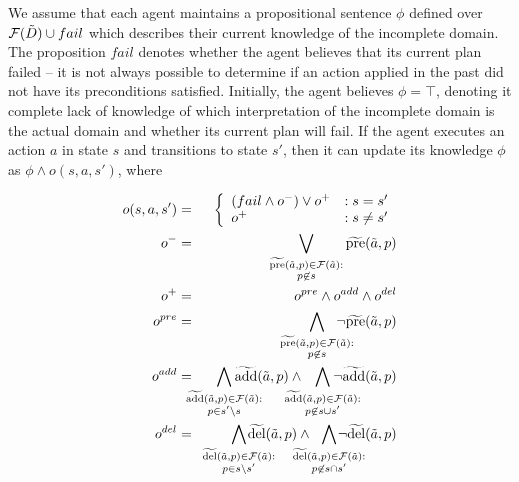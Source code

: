 \documentclass{article}
\begin{document}
We assume that each agent maintains a propositional sentence $\phi$ defined over ${\cal F}(\tilde{D}) \cup fail$ which describes their current knowledge of the incomplete domain.  The proposition $fail$ denotes whether the agent believes that its current plan failed -- it is not always possible to determine if an action applied in the past did not have its preconditions satisfied.  Initially, the agent believes $\phi = \top$, denoting it complete lack of knowledge of which interpretation of the incomplete domain is the actual domain and whether its current plan will fail.    If the agent executes an action $a$ in state $s$ and transitions to state $s'$, then it can update its knowledge $\phi$ as $\phi \wedge o(s, a, s')$, where 

\noindent \begin{eqnarray}
o(s, a, s') &=& \left\{ \begin{array}{ll}
(fail \wedge o^-) \vee  o^+  &: s = s'\\
o^+  & : s \not= s'
\end{array}\right.\\
o^- &=& \bigvee\limits_{\substack{\widetilde{\text{pre}}(\tilde{a},p) \in {\cal F}(\tilde{a}):\\ p \not\in s} } \widetilde{\text{pre}}(\tilde{a},p)  \\
o^+ &=& o^{pre} \wedge o^{add} \wedge o^{del}\\
o^{pre} &=& \bigwedge\limits_{\substack{\widetilde{\text{pre}}(\tilde{a},p) \in {\cal F}(\tilde{a}):\\ p \not\in s} }\hspace*{-0.5cm}\neg \widetilde{\text{pre}}(\tilde{a},p)  \\
o^{add} &=&  \hspace*{-.5cm}\bigwedge\limits_{\substack{\widetilde{\text{add}}(\tilde{a},p) \in {\cal F}(\tilde{a}):\\ p\in s'\backslash s} }\hspace*{-0.75cm}\widetilde{\text{add}}(\tilde{a},p)   \wedge  \hspace*{-0.5cm}\bigwedge\limits_{\substack{\widetilde{\text{add}}(\tilde{a},p) \in {\cal F}(\tilde{a}): \\ p \not\in  s\cup s'}} \hspace*{-0.75cm}\neg \widetilde{\text{add}}(\tilde{a},p)   \\
o^{del} &=& \hspace*{-.5cm} \bigwedge\limits_{\substack{\widetilde{\text{del}}(\tilde{a},p) \in {\cal F}(\tilde{a}): \\p \in s \backslash s'}} \hspace*{-0.75cm}\widetilde{\text{del}}(\tilde{a},p)  \wedge  \hspace*{-0.5cm}\bigwedge\limits_{\substack{\widetilde{\text{del}}(\tilde{a},p) \in {\cal F}(\tilde{a}):\\ p \not\in s\cap s'}} \hspace*{-0.75cm}\neg \widetilde{\text{del}}(\tilde{a},p)  
\end{eqnarray}
\end{document}
